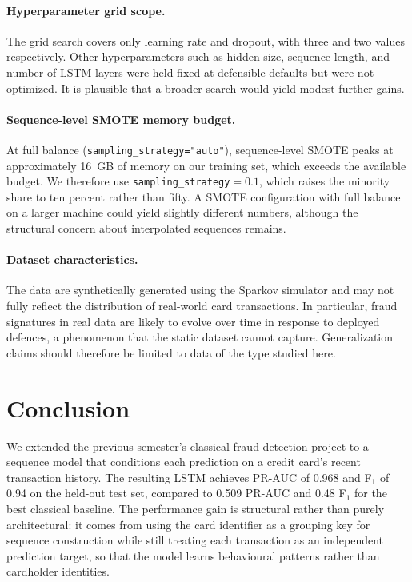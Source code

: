 \documentclass[oneside,12pt,parskip=half,american,numbers=noenddot]{scrreprt}
\begin{document}
\paragraph{Hyperparameter grid scope.}
The grid search covers only learning rate and dropout, with three and 
two values respectively. Other hyperparameters such as hidden size, 
sequence length, and number of LSTM layers were held fixed at 
defensible defaults but were not optimized. It is plausible that a 
broader search would yield modest further gains.

\paragraph{Sequence-level SMOTE memory budget.}
At full balance (\texttt{sampling\_strategy="auto"}), sequence-level 
SMOTE peaks at approximately 16~GB of memory on our training set, 
which exceeds the available budget. We therefore use 
\texttt{sampling\_strategy}$=0.1$, which raises the minority share to 
ten percent rather than fifty. A SMOTE configuration with full balance 
on a larger machine could yield slightly different numbers, although 
the structural concern about interpolated sequences remains.

\paragraph{Dataset characteristics.}
The data are synthetically generated using the Sparkov simulator and 
may not fully reflect the distribution of real-world card transactions. 
In particular, fraud signatures in real data are likely to evolve over 
time in response to deployed defences, a phenomenon that the static 
dataset cannot capture. Generalization claims should therefore be 
limited to data of the type studied here.


\section{Conclusion}

We extended the previous semester's classical fraud-detection project 
to a sequence model that conditions each prediction on a credit card's 
recent transaction history. The resulting LSTM achieves PR-AUC of 
0.968 and F$_1$ of 0.94 on the held-out test set, compared to 0.509 
PR-AUC and 0.48 F$_1$ for the best classical baseline. The performance 
gain is structural rather than purely architectural: it comes from 
using the card identifier as a grouping key for sequence construction 
while still treating each transaction as an independent prediction 
target, so that the model learns behavioural patterns rather than 
cardholder identities.
\end{document}
